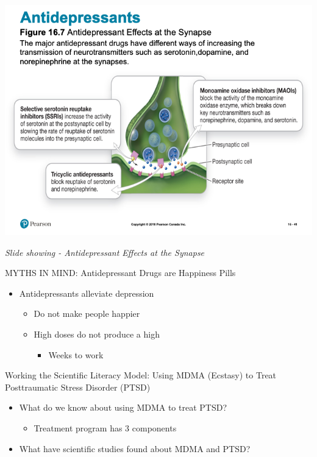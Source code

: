 \documentclass[
]{book}
\providecommand{\tightlist}{%
  \setlength{\itemsep}{0pt}\setlength{\parskip}{0pt}}
\begin{document}
\begin{reflect}
\includegraphics{assets/unit_11/slide_41.png}

\emph{Slide showing - Antidepressant Effects at the Synapse}

MYTHS IN MIND: Antidepressant Drugs are Happiness Pills

\begin{itemize}
\tightlist
\item
  Antidepressants alleviate depression

  \begin{itemize}
  \tightlist
  \item
    Do not make people happier\\
  \item
    High doses do not produce a high

    \begin{itemize}
    \tightlist
    \item
      Weeks to work
    \end{itemize}
  \end{itemize}
\end{itemize}

Working the Scientific Literacy Model: Using MDMA (Ecstasy) to Treat Posttraumatic Stress Disorder (PTSD)

\begin{itemize}
\tightlist
\item
  What do we know about using MDMA to treat PTSD?

  \begin{itemize}
  \tightlist
  \item
    Treatment program has 3 components\\
  \end{itemize}
\item
  What have scientific studies found about MDMA and PTSD?


\end{itemize}
\end{reflect}
\end{document}
